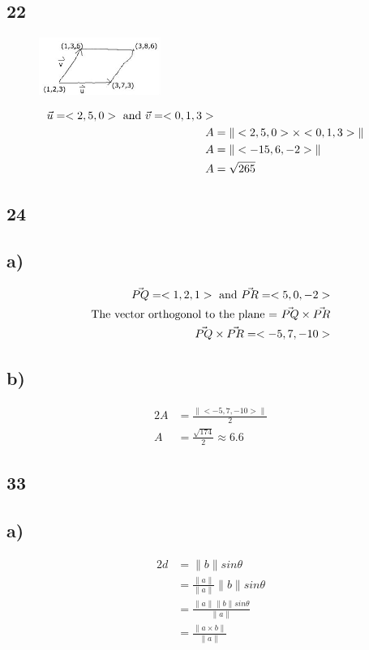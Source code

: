 \documentclass{article}%
\begin{document}
%
\subsection*{22}%


\begin{figure}[h!]%
\centering%
\includegraphics[width=150px]{para1.jpg}%
\end{figure}

%
\begin{alignat*}{2}%
\vec{u} = <2,5,0> \textnormal{ and } \vec{v} = <0,1,3>\\%
A &= \|<2,5,0> \times <0,1,3>\| \\%
A &= \|<-15,6,-2>\| \\%
A &= \sqrt{265}%
\end{alignat*}

%
\subsection*{24}%
\subsection*{a)}%
\begin{alignat*}{2}%
\vec{PQ} = <1,2,1> \textnormal{ and } \vec{PR} = <5,0,-2>\\%
\textnormal{The vector orthogonol to the plane = } \vec{PQ} \times \vec{PR}\\%
\vec{PQ} \times \vec{PR} = <-5,7,-10>\\%
\end{alignat*}

%
\subsection*{b)}%
\begin{alignat*}{2}%
A &= \frac{\|<-5,7,-10>\|}{2}\\%
A &= \frac{\sqrt{174}}{2} \approx 6.6%
\end{alignat*}

%
\subsection*{33}%
\subsection*{a)}%
\begin{alignat*}{2}%
d &= \|b\|sin\theta\\%
&=\frac{\|a\|}{\|a\|}\|b\|sin\theta\\%
&= \frac{\|a\|\|b\|sin\theta}{\|a\|}\\%
&= \frac{\|a \times b\|}{\|a\|}\\%
\end{alignat*}
\end{document}
